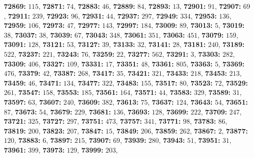 \textsf{\bfseries 72869:} $115$, \textsf{\bfseries 72871:} $74$, \textsf{\bfseries 72883:} $46$, \textsf{\bfseries 72889:} $84$, \textsf{\bfseries 72893:} $13$, \textsf{\bfseries 72901:} $91$, \textsf{\bfseries 72907:} $69$, \textsf{\bfseries 72911:} $239$, \textsf{\bfseries 72923:} $96$, \textsf{\bfseries 72931:} $44$, \textsf{\bfseries 72937:} $297$, \textsf{\bfseries 72949:} $334$, \textsf{\bfseries 72953:} $136$, \textsf{\bfseries 72959:} $106$, \textsf{\bfseries 72973:} $47$, \textsf{\bfseries 72977:} $143$, \textsf{\bfseries 72997:} $184$, \textsf{\bfseries 73009:} $89$, \textsf{\bfseries 73013:} $5$, \textsf{\bfseries 73019:} $38$, \textsf{\bfseries 73037:} $38$, \textsf{\bfseries 73039:} $67$, \textsf{\bfseries 73043:} $348$, \textsf{\bfseries 73061:} $351$, \textsf{\bfseries 73063:} $451$, \textsf{\bfseries 73079:} $159$, \textsf{\bfseries 73091:} $128$, \textsf{\bfseries 73121:} $53$, \textsf{\bfseries 73127:} $39$, \textsf{\bfseries 73133:} $32$, \textsf{\bfseries 73141:} $28$, \textsf{\bfseries 73181:} $240$, \textsf{\bfseries 73189:} $522$, \textsf{\bfseries 73237:} $221$, \textsf{\bfseries 73243:} $76$, \textsf{\bfseries 73259:} $22$, \textsf{\bfseries 73277:} $562$, \textsf{\bfseries 73291:} $3$, \textsf{\bfseries 73303:} $282$, \textsf{\bfseries 73309:} $406$, \textsf{\bfseries 73327:} $109$, \textsf{\bfseries 73331:} $17$, \textsf{\bfseries 73351:} $48$, \textsf{\bfseries 73361:} $805$, \textsf{\bfseries 73363:} $5$, \textsf{\bfseries 73369:} $476$, \textsf{\bfseries 73379:} $42$, \textsf{\bfseries 73387:} $268$, \textsf{\bfseries 73417:} $35$, \textsf{\bfseries 73421:} $321$, \textsf{\bfseries 73433:} $218$, \textsf{\bfseries 73453:} $213$, \textsf{\bfseries 73459:} $46$, \textsf{\bfseries 73471:} $134$, \textsf{\bfseries 73477:} $322$, \textsf{\bfseries 73483:} $155$, \textsf{\bfseries 73517:} $80$, \textsf{\bfseries 73523:} $72$, \textsf{\bfseries 73529:} $261$, \textsf{\bfseries 73547:} $158$, \textsf{\bfseries 73553:} $185$, \textsf{\bfseries 73561:} $164$, \textsf{\bfseries 73571:} $44$, \textsf{\bfseries 73583:} $329$, \textsf{\bfseries 73589:} $31$, \textsf{\bfseries 73597:} $63$, \textsf{\bfseries 73607:} $240$, \textsf{\bfseries 73609:} $382$, \textsf{\bfseries 73613:} $75$, \textsf{\bfseries 73637:} $124$, \textsf{\bfseries 73643:} $54$, \textsf{\bfseries 73651:} $87$, \textsf{\bfseries 73673:} $54$, \textsf{\bfseries 73679:} $229$, \textsf{\bfseries 73681:} $136$, \textsf{\bfseries 73693:} $128$, \textsf{\bfseries 73699:} $222$, \textsf{\bfseries 73709:} $247$, \textsf{\bfseries 73721:} $325$, \textsf{\bfseries 73727:} $297$, \textsf{\bfseries 73751:} $473$, \textsf{\bfseries 73757:} $341$, \textsf{\bfseries 73771:} $98$, \textsf{\bfseries 73783:} $86$, \textsf{\bfseries 73819:} $200$, \textsf{\bfseries 73823:} $207$, \textsf{\bfseries 73847:} $15$, \textsf{\bfseries 73849:} $206$, \textsf{\bfseries 73859:} $262$, \textsf{\bfseries 73867:} $2$, \textsf{\bfseries 73877:} $120$, \textsf{\bfseries 73883:} $6$, \textsf{\bfseries 73897:} $215$, \textsf{\bfseries 73907:} $69$, \textsf{\bfseries 73939:} $280$, \textsf{\bfseries 73943:} $51$, \textsf{\bfseries 73951:} $31$, \textsf{\bfseries 73961:} $399$, \textsf{\bfseries 73973:} $129$, \textsf{\bfseries 73999:} $203$, 
